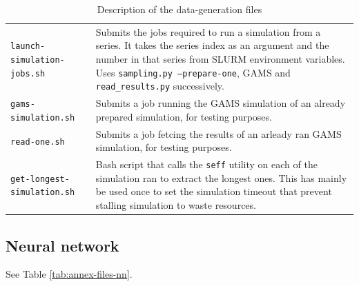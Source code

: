 \begin{table}[h]
\begin{tabular}{|p{}|p{}|}
        \texttt{launch-simulation-} \texttt{jobs.sh} & Submits the jobs required to run a simulation from a series. It takes the series index as an argument and the number in that series from SLURM environment variables. Uses \texttt{sampling.py --prepare-one}, GAMS and \texttt{read\_results.py} successively. \\
        \texttt{gams-simulation.sh} & Submits a job running the GAMS simulation of an already prepared simulation, for testing purposes. \\
        \texttt{read-one.sh} & Submits a job fetcing the results of an arleady ran GAMS simulation, for testing purposes. \\
        \texttt{get-longest-} \texttt{simulation.sh} & Bash script that calls the \texttt{seff} utility on each of the simulation ran to extract the longest ones. This has mainly be used once to set the simulation timeout that prevent stalling simulation to waste resources. \\ \hline
    \end{tabular}
    \caption{Description of the data-generation files}
    \label{tab:annex-files-datagen}
\end{table}

\subsection{Neural network}

See Table \ref{tab:annex-files-nn}.

